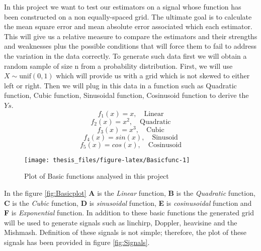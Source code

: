 \documentclass[12pt,twoside, a4paper]{reedthesis}
\begin{document}
In this project we want to test our estimators on a signal whose function has been constructed on a non equally-spaced grid. The ultimate goal is to calculate the mean square error and mean absolute error associated which each estimator. This will give us a relative measure to compare the estimators and their strengths and weaknesses plus the possible conditions that will force them to fail to address the variation in the data correctly.
To generate such data first we will obtain a random sample of size n from a probability distribution. First, we will use \(X \sim \text{unif}(0,1)\) which will provide us with a grid which is not skewed to either left or right. Then we will plug in this data in a function such as Quadratic function, Cubic function, Sinusoidal function, Cosinusoid function to derive the \(Ys\).
\[
f_1(x)=x,\quad \text{Linear}\]
\[f_2(x)=x^2,\quad \text{Quadratic}\]
\[f_3(x)=x^3,\quad \text{Cubic}\]
\[f_4(x)=sin(x),\quad \text{Sinusoid}\]
\[f_5(x)=cos(x),\quad \text{Cosinusoid} \]
\begin{figure}[htb!]

{\centering \texttt{[image: thesis\_files/figure-latex/Basicfunc-1]} 

}

\caption{\label{fig:Basicplot}Plot of Basic functions analysed in this project}\label{fig:Basicfunc}
\end{figure}
In the figure \ref{fig:Basicplot} \textbf{A} is the \emph{Linear} function, \textbf{B} is the \emph{Quadratic} function, \textbf{C} is the \emph{Cubic} function, \textbf{D} is \emph{sinusoidal} function, \textbf{E} is \emph{cosinusoidal} function and \textbf{F} is \emph{Exponential} function. In addition to these basic functions the generated grid will be used to generate signals such as linchirp, Doppler, heavisine and the Mishmash. Definition of these signals is not simple; therefore, the plot of these signals has been provided in figure \ref{fig:Signals}.
\end{document}
